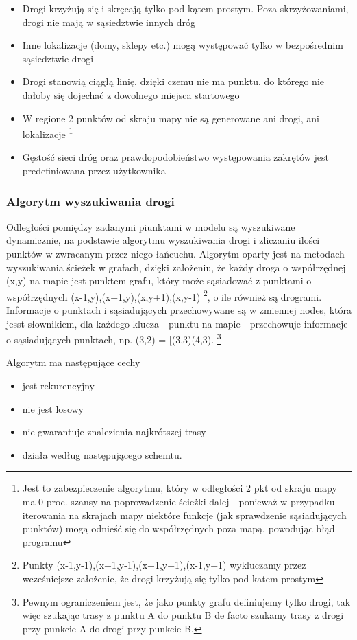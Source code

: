 \documentclass{article}
\begin{document}
	\begin{itemize}
		\item Drogi krzyżują się i skręcają tylko pod kątem prostym. Poza skrzyżowaniami, drogi nie mają w sąsiedztwie innych dróg
		\item Inne lokalizacje (domy, sklepy etc.) mogą występować tylko w bezpośrednim sąsiedztwie drogi
		\item Drogi stanowią ciągłą linię, dzięki czemu nie ma punktu, do którego nie dałoby się dojechać z dowolnego miejsca startowego
		\item W regione 2 punktów od skraju mapy nie są generowane ani drogi, ani lokalizacje  \footnote{Jest to zabezpieczenie algorytmu, który w odległości 2 pkt od skraju mapy ma 0 proc. szansy na poprowadzenie ścieżki dalej - ponieważ w przypadku iterowania na skrajach mapy niektóre funkcje (jak sprawdzenie sąsiadujących punktów) mogą odnieść się do współrzędnych poza mapą, powodując błąd programu}
	 	\item Gęstość sieci dróg oraz prawdopodobieństwo występowania zakrętów jest predefiniowana przez użytkownika
	\end{itemize}

\subsubsection{Algorytm wyszukiwania drogi} 

Odległości pomiędzy zadanymi piunktami w modelu są wyszukiwane dynamicznie, na podstawie algorytmu wyszukiwania drogi i zliczaniu ilości punktów w zwracanym przez niego łańcuchu. Algorytm oparty jest na metodach wyszukiwania ścieżek w grafach, dzięki założeniu, że każdy droga o współrzędnej (x,y) na mapie jest punktem grafu, który może sąsiadować z punktami o współrzędnych (x-1,y),(x+1,y),(x,y+1),(x,y-1) \footnote{Punkty (x-1,y-1),(x+1,y-1),(x+1,y+1),(x-1,y+1) wykluczamy przez wcześniejsze założenie, że drogi krzyżują się tylko pod katem prostym}, o ile również są drogrami. Informacje o punktach i sąsiadujących przechowywane są w zmiennej nodes, która jesst słownikiem, dla każdego klucza - punktu na mapie - przechowuje informacje o sąsiadujących punktach, np. (3,2) = [(3,3)(4,3). \footnote{Pewnym ograniczeniem jest, że jako punkty grafu definiujemy tylko drogi, tak więc szukając trasy z punktu A do punktu B de facto szukamy trasy z drogi przy punkcie A do drogi przy punkcie B.}

Algorytm ma następujące cechy

	\begin{itemize}
		\item jest rekurencyjny
		\item nie jest losowy
		\item nie gwarantuje znalezienia najkrótszej trasy
		\item działa według następującego schemtu.
	\end{itemize}
\end{document}
